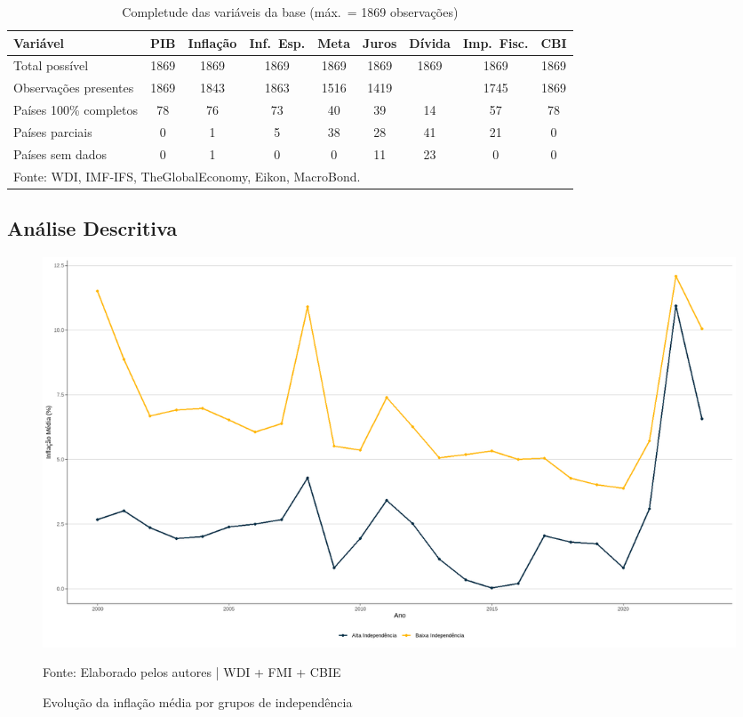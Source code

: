 \documentclass[a4paper,12pt]{article}
\begin{document}
\begin{table}[H]
\centering
\small
\caption{Completude das variáveis da base (máx.\ = 1869 observações)}
\setlength{\tabcolsep}{3pt}
\begin{tabular}{lcccccccc}
\toprule
\textbf{Variável} & \textbf{PIB} & \textbf{Inflação} & \textbf{Inf.\ Esp.} & \textbf{Meta} & \textbf{Juros} & \textbf{Dívida} & \textbf{Imp.\ Fisc.} & \textbf{CBI} \\
\midrule
Total possível           & 1869 & 1869 & 1869 & 1869 & 1869 & 1869 & 1869 & 1869 \\
Observações presentes    & 1869 & 1843 & 1863 & 1516 & 1419 & \;923 & 1745 & 1869 \\
Países 100\% completos  & 78   & 76   & 73   & 40   & 39   & 14   & 57   & 78   \\
Países parciais          & 0    & 1    & 5    & 38   & 28   & 41   & 21   & 0    \\
Países sem dados         & 0    & 1    & 0    & 0    & 11   & 23   & 0    & 0    \\
\bottomrule
\multicolumn{9}{l}{\footnotesize Fonte: WDI, IMF‑IFS, TheGlobalEconomy, Eikon, MacroBond.}
\end{tabular}
\label{tab:observações_base_dados}
\end{table}


\subsection*{\textbf{Análise Descritiva}}

\begin{figure}[H]
    \centering
    \caption{Evolução da inflação média por grupos de independência}
    \includegraphics[width=.85\linewidth]{Imagens/paperi6.png}
    \label{fig:infl_media}

    \footnotesize{Fonte: Elaborado pelos autores | WDI + FMI + CBIE}
\end{figure}
\end{document}
